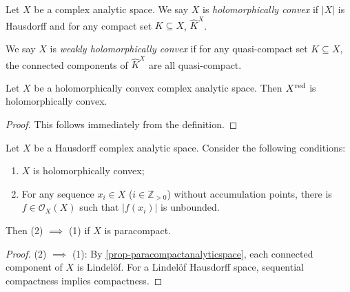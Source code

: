 \iffalse
\begin{thm}[Grauert]
    Let $X$ be a holomorphically spreadable complex analytic space. Then there is $n\in \mathbb{N}$ a quasi-finite morphism $f:X\rightarrow \mathbb{C}^n$.
\end{thm}
\begin{proof}
    
\end{proof}
\fi


\begin{definition}
    Let $X$ be a complex analytic space. We say $X$ is \emph{holomorphically convex} if $|X|$ is Hausdorff and for any compact set $K\subseteq X$, $\hat{K}^X$.

    We say $X$ is \emph{weakly holomorphically convex} if for any quasi-compact set $K\subseteq X$, the connected components of $\hat{K}^X$ are all quasi-compact.
\end{definition}

\begin{proposition}
    Let $X$ be a holomorphically convex complex analytic space. Then $X^{\operatorname{red}}$ is holomorphically convex.
\end{proposition}
\begin{proof}
    This follows immediately from the definition.
\end{proof}

\begin{proposition}\label{prop-holoconvchar}
    Let $X$ be a Hausdorff complex analytic space. Consider the following conditions:
    \begin{enumerate}
        \item $X$ is holomorphically convex;
        \item For any sequence $x_i\in X$ ($i\in \mathbb{Z}_{>0}$) without accumulation points, there is $f\in \mathcal{O}_X(X)$ such that $|f(x_i)|$ is unbounded.
    \end{enumerate}
    Then (2) $\implies$ (1) if $X$ is paracompact.
\end{proposition}
\begin{proof}
    (2) $\implies$ (1): By \cref{prop-paracompactanalyticspace}, each connected component of $X$ is Lindelöf.
    For a Lindelöf Hausdorff space, sequential compactness implies compactness. 

\end{proof}

